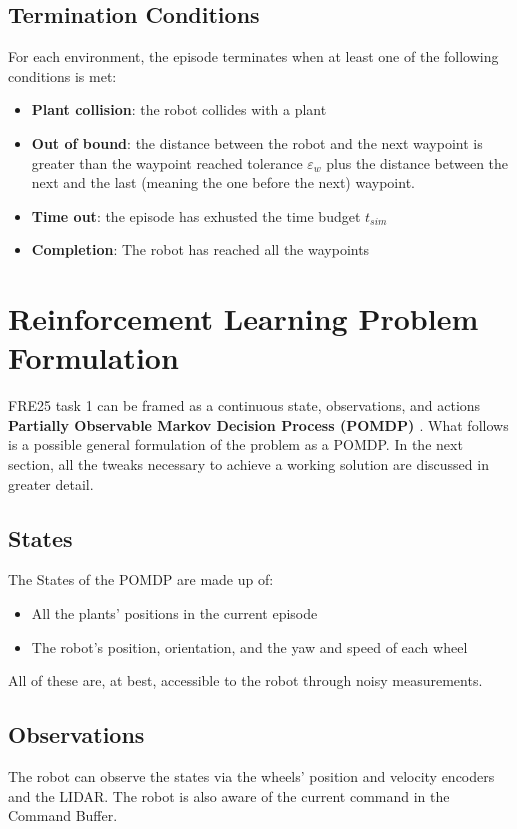 \documentclass[11pt,a4paper,twocolumn]{article}
\begin{document}
\subsection{Termination Conditions}
For each environment, the episode terminates when at least one of the following conditions is met:
\begin{itemize}
    \item \textbf{Plant collision}: the robot collides with a plant
    \item \textbf{Out of bound}: the distance between the robot and the next waypoint is greater than the waypoint reached tolerance $\varepsilon_w$ plus the distance between the next and the last (meaning the one before the next) waypoint.
    \item \textbf{Time out}: the episode has exhusted the time budget $t_{sim}$
    \item \textbf{Completion}: The robot has reached all the waypoints
\end{itemize}

\section{Reinforcement Learning Problem Formulation}
FRE25 task 1 can be framed as a continuous state, observations, and actions \textbf{Partially Observable Markov Decision Process (POMDP) \cite{POMDPS}}. What follows is a possible general formulation of the problem as a POMDP. In the next section, all the tweaks necessary to achieve a working solution are discussed in greater detail. 

\subsection{States}
The States of the POMDP are made up of:
\begin{itemize}
    \item All the plants' positions in the current episode
    \item The robot's position, orientation, and the yaw and speed of each wheel
\end{itemize}

All of these are, at best, accessible to the robot through noisy measurements.

\subsection{Observations}
The robot can observe the states via the wheels' position and velocity encoders and the LIDAR. The robot is also aware of the current command in the Command Buffer.
\end{document}

